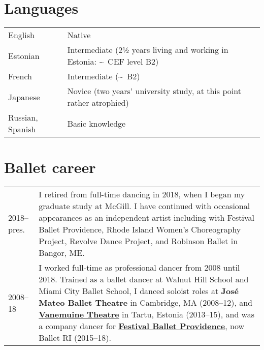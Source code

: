 \documentclass[11pt,a4paper]{article}
\begin{document}
  \section{Languages}

  \begin{longtable}[l]{ll}
    English
    &%
      Native\\
    Estonian 
    &%
      Intermediate (2½ years living and working in Estonia:
      \textasciitilde\ CEF level B2)\\
    French 
    &%
      Intermediate (\textasciitilde\ B2)\\
    Japanese
    &%
      Novice (two years' university study, at this point rather atrophied)\\
    Russian, Spanish%
    &%
      Basic knowledge\\
  \end{longtable}

  \section{Ballet career}
  \begin{longtable}{p{1.7cm}|p{15cm}} 2018--pres.
    &%
    I retired from full-time dancing in 2018, when I began my graduate study at
    McGill. I have continued with occasional appearances as an independent
    artist including with Festival Ballet Providence,  Rhode Island Women's
    Choreography Project,  Revolve Dance Project,  and Robinson Ballet in
    Bangor, ME.\\
    \textsc{2008--18}
    &%
    I worked full-time as professional dancer from 2008 until 2018. Trained as a
    ballet dancer at Walnut Hill School and Miami City Ballet School, I danced
    soloist roles at \textbf{José Mateo Ballet Theatre} in Cambridge, MA
    (2008--12), and \href{http://vanemuine.ee}{\textbf{Vanemuine Theatre}} in
    Tartu, Estonia (2013--15), and was a company dancer for
    \href{http://festivalballetprovidence.org}{\textbf{Festival Ballet
    Providence}}, now Ballet RI (2015--18).\\
  \end{longtable}

  
\end{document}
